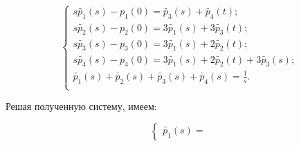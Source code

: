 \documentclass[14pt,a4paper]{scrartcl}
\begin{document}
\begin{equation*}
	\begin{cases}
		s\widetilde{p_1}(s) - p_1(0) = \widetilde{p_3}(s) + \widetilde{p_4}(t);\\
		s\widetilde{p_2}(s) - p_2(0) = 3\widetilde{p_1}(s) + 3\widetilde{p_3}(t);\\
		s\widetilde{p_3}(s) - p_3(0) = 3\widetilde{p_1}(s) + 2\widetilde{p_2}(t);\\
		s\widetilde{p_4}(s) - p_4(0) = 3\widetilde{p_1}(s) + 2\widetilde{p_2}(t) + 3\widetilde{p_3}(s);\\
		
		\widetilde{p_1}(s) + \widetilde{p_2}(s) + \widetilde{p_3}(s) + \widetilde{p_4}(s) = \frac{1}{s}.\\
	\end{cases}
\end{equation*}

Решая полученную систему, имеем:

\begin{equation*}
	\begin{cases}
		\widetilde{p_1}(s) = 
	\end{cases}
\end{equation*}
\end{document}
